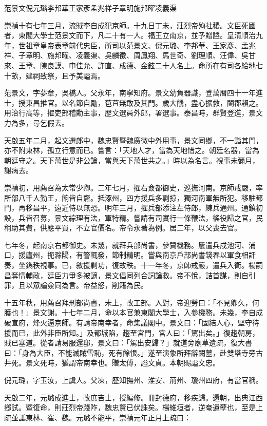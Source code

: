 
\begin{pinyinscope}
范景文倪元璐李邦華王家彥孟兆祥子章明施邦曜凌義渠

崇禎十有七年三月，流賊李自成犯京師。十九日丁未，莊烈帝殉社稷。文臣死國者，東閣大學士范景文而下，凡二十有一人。福王立南京，並予贈謚。皇清順治九年，世祖章皇帝表章前代忠臣，所司以范景文、倪元璐、李邦華、王家彥、孟兆祥、子章明、施邦曜、凌義渠、吳麟徵、周鳳翔、馬世奇、劉理順、汪偉、吳甘來、王章、陳良謨、申佳允、許直、成德、金鉉二十人名上。命所在有司各給地七十畝，建祠致祭，且予美謚焉。

范景文，字夢章，吳橋人。父永年，南寧知府。景文幼負器識，登萬曆四十一年進士，授東昌推官。以名節自勵，苞苴無敢及其門。歲大饑，盡心振救，闔郡賴之。用治行高等，擢吏部稽勳主事，歷文選員外郎，署選事。泰昌時，群賢登進，景文力為多，尋乞假去。

天啟五年二月，起文選郎中，魏忠賢暨魏廣微中外用事，景文同鄉，不一詣其門，亦不附東林，孤立行意而已。嘗言：「天地人才，當為天地惜之。朝廷名器，當為朝廷守之。天下萬世是非公論，當與天下萬世共之。」時以為名言。視事未彌月，謝病去。

崇禎初，用薦召為太常少卿。二年七月，擢右僉都御史，巡撫河南。京師戒嚴，率所部八千人勤王，餉皆自齎。抵涿州，四方援兵多剽掠，獨河南軍無所犯。移駐都門，再移昌平，遠近恃以無恐。明年三月，擢兵部添注左侍郎，練兵通州。通鎮初設，兵皆召募，景文綜理有法，軍特精。嘗請有司實行一條鞭法，徭役歸之官，民稍助其費，供應平買，不立官價名。帝令永著為例。居二年，以父喪去官。

七年冬，起南京右都御史。未幾，就拜兵部尚書，參贊機務。屢遣兵戍池河、浦口，援廬州，扼滁陽，有警輒發，節制精明。嘗與南京戶部尚書錢春以軍食相訐奏，坐鐫秩視事。已，敘援剿功，復故秩。十一年冬，京師戒嚴，遣兵入衛。楊嗣昌奪情輔政，廷臣力爭多被謫，景文倡同列合詞論救。帝不悅，詰首謀，則自引罪，且以眾論僉同為言。帝益怒，削籍為民。

十五年秋，用薦召拜刑部尚書，未上，改工部。入對，帝迎勞曰：「不見卿久，何臒也！」景文謝。十七年二月，命以本官兼東閣大學士，入參機務。未幾，李自成破宣府，烽火逼京師。有請帝南幸者，命集議閣中。景文曰：「固結人心，堅守待援而已，此外非臣所知。」及都城陷，趨至宮門，宮人曰：「駕出矣。」復趨朝房，賊已塞道。從者請易服還邸，景文曰：「駕出安歸？」就道旁廟草遺疏，復大書曰：「身為大臣，不能滅賊雪恥，死有餘恨。」遂至演象所拜辭闕墓，赴雙塔寺旁古井死。景文死時，猶謂帝南幸也。贈太傅，謚文貞。本朝賜謚文忠。

倪元璐，字玉汝，上虞人。父凍，歷知撫州、淮安、荊州、瓊州四府，有當官稱。

天啟二年，元璐成進士，改庶吉士，授編修。冊封德府，移疾歸。還朝，出典江西鄉試。暨復命，則莊烈帝踐阼，魏忠賢已伏誅矣。楊維垣者，逆奄遺孽也，至是上疏並詆東林、崔、魏。元璐不能平，崇禎元年正月上疏曰：


\end{pinyinscope}
